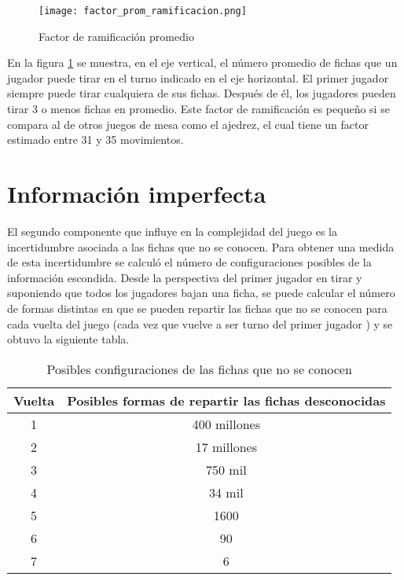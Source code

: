 \begin{figure}[ht]
    \begin{center}
        \texttt{[image: factor\_prom\_ramificacion.png]}
        \caption{Factor de ramificación promedio}
        \label{FPR}
    \end{center}
\end{figure}

En la figura \ref{FPR} se muestra, en el eje vertical, el número promedio de
fichas que un jugador puede tirar en el turno indicado en el eje horizontal. El
primer jugador siempre puede tirar cualquiera de sus fichas. Después de él, los
jugadores pueden tirar 3 o menos fichas en promedio. Este factor de ramificación
es pequeño si se compara al de otros juegos de mesa como el ajedrez, el cual
tiene un factor estimado entre 31 y 35 movimientos.

\section{Información imperfecta}

El segundo componente que influye en la complejidad del juego es la
incertidumbre asociada a las fichas que no se conocen. Para obtener una medida
de esta incertidumbre se calculó el número de configuraciones posibles de la
información escondida. Desde la perspectiva del primer jugador en tirar y
suponiendo que todos los jugadores bajan una ficha, se puede calcular el número
de formas distintas en que se pueden repartir las fichas que no se conocen para
cada vuelta del juego (cada vez que vuelve a ser turno del primer jugador ) y se
obtuvo la siguiente tabla.

\begin{table}[H]
    \centering
    \caption{Posibles configuraciones de las fichas que no se conocen}
    \label{PC}
    \begin{tabular}{|c|c|}
        \hline
        Vuelta & Posibles formas de repartir las fichas desconocidas \\
        \hline
        1      & 400 millones                                        \\
        2      & 17 millones                                         \\
        3      & 750 mil                                             \\
        4      & 34 mil                                              \\
        5      & 1600                                                \\
        6      & 90                                                  \\
        7      & 6                                                   \\
        \hline
    \end{tabular}


\end{table}

